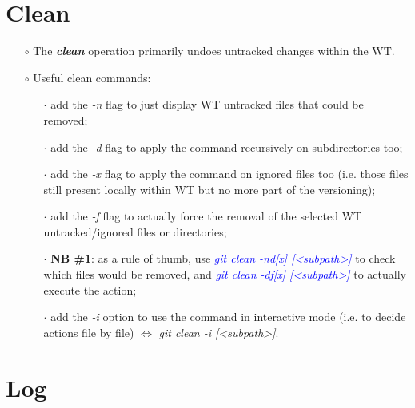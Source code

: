 \documentclass[a4paper,portrait,10pt]{article}   %
\newcommand{\mybulletlvA}{$\circ$}   %
\newcommand{\mybulletlvB}{$\cdot$}   %
\newcommand{\mydiv}{$\Leftrightarrow$ }   %
\newcommand{\mycmd}[1]{\textcolor{blue}{\textit{#1}}}   %
\newcommand{\myvspace}{\vspace{4mm}}   %
\begin{document}

\section{Clean}   \label{sec:Clean}

\begin{itemize}
\item[\mybulletlvA] The \textbf{\textit{clean}} operation primarily undoes untracked changes within the WT.
\myvspace

\item[\mybulletlvA] Useful clean commands:
\begin{itemize}
  \item[\mybulletlvB] add the \textit{-n} flag to just display WT untracked files that could be removed;
  \item[\mybulletlvB] add the \textit{-d} flag to apply the command recursively on subdirectories too;
  \item[\mybulletlvB] add the \textit{-x} flag to apply the command on ignored files too (i.e. those files still present locally within WT but no more part of the versioning);
  \item[\mybulletlvB] add the \textit{-f} flag to actually force the removal of the selected WT untracked/ignored files or directories;
  \item[\mybulletlvB] \textbf{NB \#1}: as a rule of thumb, use \mycmd{git clean -nd[x] [<subpath>]} to check which files would be removed, and \mycmd{git clean -df[x] [<subpath>]} to actually execute the action;
  \item[\mybulletlvB] add the \textit{-i} option to use the command in interactive mode (i.e. to decide actions file by file) \mydiv \textit{git clean -i [<subpath>]}.
\end{itemize}
\end{itemize}
\myvspace


\section{Log}   \label{sec:Log}
\end{document}
